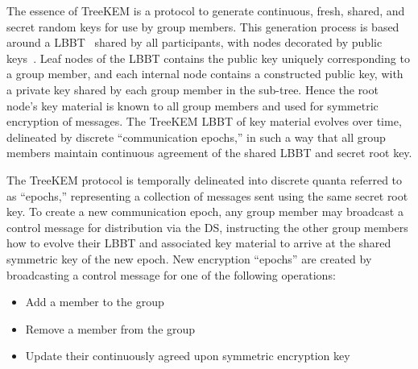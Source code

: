 \documentclass[runningheads]{llncs}
\newcommand{\Abrev}[1]{\gls{#1}}
\begin{document}
The essence of TreeKEM is a protocol to generate continuous, fresh, shared, and secret random keys for use by group members.
This generation process is based around a \Abrev{LBBT}~\cite{baerentzen2003left} shared by all participants, with nodes decorated by public keys~\cite{rfc4949}.
Leaf nodes of the \Abrev{LBBT} contains the public key uniquely corresponding to a group member, and each 
internal node contains a constructed public key, with a private key shared by each group member in the sub-tree.
Hence the root node's key material is known to all group members and used for symmetric encryption of messages.
The TreeKEM \Abrev{LBBT} of key material evolves over time, delineated by discrete ``communication epochs,'' in such a way that all group members maintain continuous agreement of the shared \Abrev{LBBT} and secret root key.

The TreeKEM protocol is temporally delineated into discrete quanta referred to as ``epochs,'' representing a collection of messages sent using the same secret root key.
To create a new communication epoch, any group member may broadcast a control message for distribution via the \Abrev{DS}, instructing the other group members how to evolve their \Abrev{LBBT} and associated key material to arrive at the shared symmetric key of the new epoch.
New encryption ``epochs'' are created by broadcasting a control message for one of the following operations:

\begin{itemize}
	\item Add a member to the group
	\item Remove a member from the group
	\item Update their continuously agreed upon symmetric encryption key
\end{itemize}




%
\end{document}
